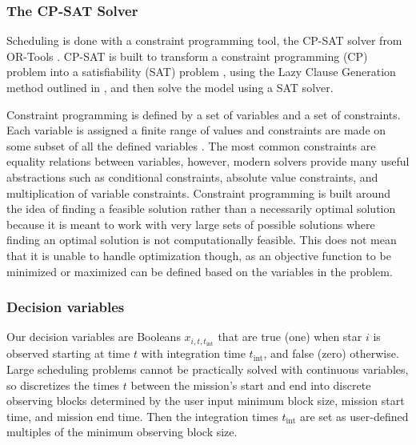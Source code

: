 \subsubsection{The CP-SAT Solver}

Scheduling is done with a constraint programming tool, the CP-SAT solver from
OR-Tools \citep{perronORTools2022}. CP-SAT is built to transform a constraint
programming (CP) problem into a satisfiability (SAT) problem
\citep{knuthSatisfiablility2018}, using the Lazy Clause Generation method
outlined in \citet{feydyLazyClause2009a}, and then solve the model using a SAT
solver.


Constraint programming is defined by a set of variables and a set of
constraints. Each variable is assigned a finite range of values and constraints
are made on some subset of all the defined variables
\citep{shawConstraintProgramming2002}. The most common constraints are equality
relations between variables, however, modern solvers provide many useful
abstractions such as conditional constraints, absolute value constraints, and
multiplication of variable constraints. Constraint programming is built around
the idea of finding a feasible solution rather than a necessarily optimal
solution because it is meant to work with very large sets of possible solutions
where finding an optimal solution is not computationally feasible. This does
not mean that it is unable to handle optimization though, as an objective
function to be minimized or maximized can be defined based on the variables in
the problem.





\subsubsection{Decision variables}

Our decision variables are Booleans $x_{i, t, t_{\textrm{int}}}$ that are true
(one) when star $i$ is observed starting at time $t$ with integration time
$t_{\textrm{int}}$, and false (zero) otherwise. Large scheduling problems
cannot be practically solved with continuous variables, so 
discretizes the times $t$ between the mission's start and end into discrete
observing blocks determined by the user input minimum block size, mission start
time, and mission end time. Then the integration times $t_{\textrm{int}}$ are
set as user-defined multiples of the minimum observing block size.

